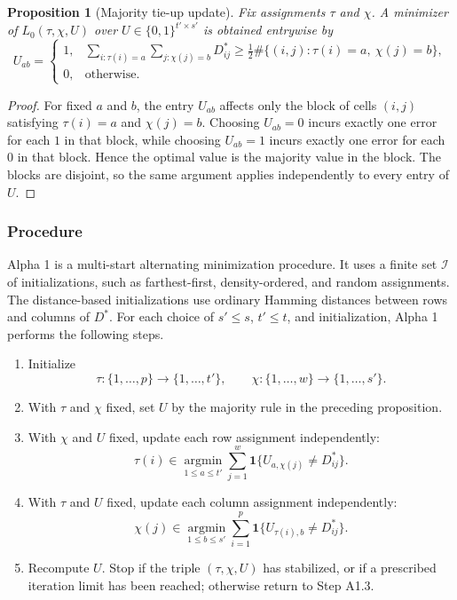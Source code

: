 \documentclass[11pt]{article}
\newtheorem{proposition}{Proposition}
\begin{document}
\begin{proposition}[Majority tie-up update]
Fix assignments \(\tau\) and \(\chi\). A minimizer of
\(L_0(\tau,\chi,U)\) over \(U\in\{0,1\}^{t'\times s'}\) is obtained entrywise
by
\[
  U_{ab}
  =
  \begin{cases}
    1,
    &
    \displaystyle
    \sum_{i:\tau(i)=a}\sum_{j:\chi(j)=b}D^\ast_{ij}
    \ge
    \frac{1}{2}
    \#\{(i,j):\tau(i)=a,\ \chi(j)=b\},
    \\[1.2em]
    0, & \text{otherwise}.
  \end{cases}
\]
\end{proposition}

\begin{proof}
For fixed \(a\) and \(b\), the entry \(U_{ab}\) affects only the block of cells
\((i,j)\) satisfying \(\tau(i)=a\) and \(\chi(j)=b\). Choosing \(U_{ab}=0\)
incurs exactly one error for each \(1\) in that block, while choosing
\(U_{ab}=1\) incurs exactly one error for each \(0\) in that block. Hence the
optimal value is the majority value in the block. The blocks are disjoint, so
the same argument applies independently to every entry of \(U\).
\end{proof}

\subsubsection*{Procedure}

Alpha 1 is a multi-start alternating minimization procedure. It uses a finite
set \(\mathcal{I}\) of initializations, such as farthest-first, density-ordered,
and random assignments. The distance-based initializations use ordinary Hamming
distances between rows and columns of \(D^\ast\). For each choice of
\(s'\le s\), \(t'\le t\), and initialization, Alpha 1 performs the following
steps.

\begin{enumerate}[label=\textbf{A1.\arabic*.}]
  \item Initialize
  \[
    \tau:\{1,\dots,p\}\to\{1,\dots,t'\},
    \qquad
    \chi:\{1,\dots,w\}\to\{1,\dots,s'\}.
  \]

  \item With \(\tau\) and \(\chi\) fixed, set \(U\) by the majority rule in the
  preceding proposition.

  \item With \(\chi\) and \(U\) fixed, update each row assignment independently:
  \[
    \tau(i)
    \in
    \operatorname*{argmin}_{1\le a\le t'}
    \sum_{j=1}^{w}
    \mathbf{1}\{U_{a,\chi(j)}\ne D^\ast_{ij}\}.
  \]

  \item With \(\tau\) and \(U\) fixed, update each column assignment independently:
  \[
    \chi(j)
    \in
    \operatorname*{argmin}_{1\le b\le s'}
    \sum_{i=1}^{p}
    \mathbf{1}\{U_{\tau(i),b}\ne D^\ast_{ij}\}.
  \]

  \item Recompute \(U\). Stop if the triple \((\tau,\chi,U)\) has stabilized, or
  if a prescribed iteration limit has been reached; otherwise return to Step
  A1.3.
\end{enumerate}
\end{document}
